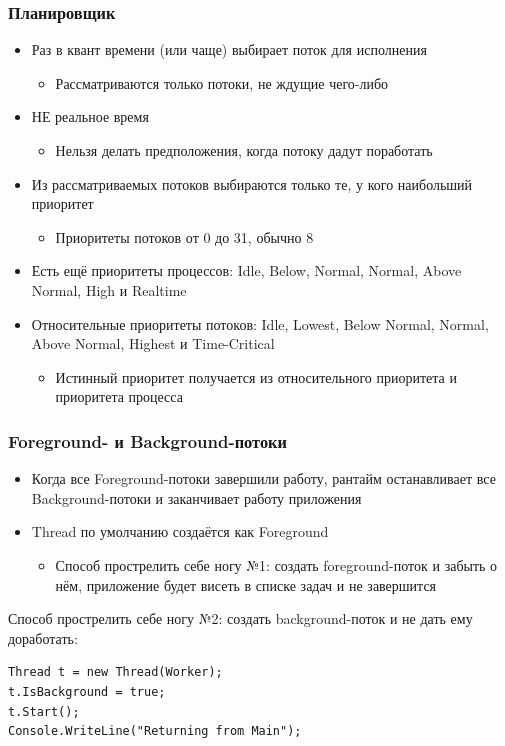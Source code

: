 \documentclass[xetex,mathserif,serif]{beamer}
\begin{document}
	\begin{frame}
		\frametitle{Планировщик}
		\begin{itemize}
			\item Раз в квант времени (или чаще) выбирает поток для исполнения
			\begin{itemize}
				\item Рассматриваются только потоки, не ждущие чего-либо
			\end{itemize}
			\item НЕ реальное время
			\begin{itemize}
				\item Нельзя делать предположения, когда потоку дадут поработать
			\end{itemize}
			\item Из рассматриваемых потоков выбираются только те, у кого наибольший приоритет
			\begin{itemize}
				\item Приоритеты потоков от 0 до 31, обычно 8
			\end{itemize}
			\item Есть ещё приоритеты процессов: Idle, Below, Normal, Normal, Above Normal, High и Realtime
			\item Относительные приоритеты потоков: Idle, Lowest, Below Normal, Normal, Above Normal, Highest и Time-Critical
			\begin{itemize}
				\item Истинный приоритет получается из относительного приоритета и приоритета процесса
			\end{itemize}
		\end{itemize}
	\end{frame}

	\begin{frame}[fragile]
		\frametitle{Foreground- и Background-потоки}
		\begin{itemize}
			\item Когда все Foreground-потоки завершили работу, рантайм останавливает все Background-потоки и заканчивает работу приложения
			\item Thread по умолчанию создаётся как Foreground
			\begin{itemize}
				\item Способ прострелить себе ногу №1: создать foreground-поток и забыть о нём, приложение будет висеть в списке задач и не завершится
			\end{itemize}
		\end{itemize}
		\vspace{5mm}
		Способ прострелить себе ногу №2: создать background-поток и не дать ему доработать:
		\begin{verbatim}
Thread t = new Thread(Worker);
t.IsBackground = true;
t.Start();
Console.WriteLine("Returning from Main");
		\end{verbatim}
	\end{frame}
\end{document}
